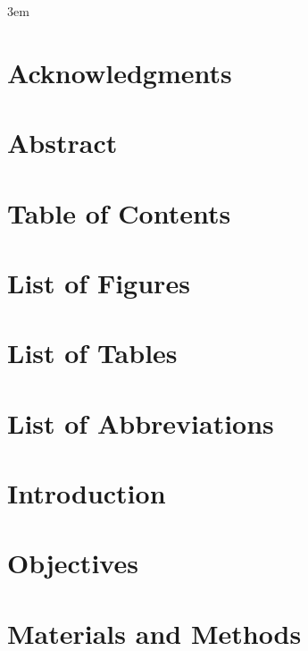 \documentclass[10pt,twoside]{book}
\begin{document}
\emergencystretch 3em

\frontmatter



\chapter{Acknowledgments}

\clearpage

\chapter{Abstract}

\clearpage

\chapter{Table of Contents}
\tableofcontents %
\clearpage

\chapter{List of Figures}
\listoffigures
\clearpage

\chapter{List of Tables}
\listoftables
\clearpage

\chapter{List of Abbreviations}

\clearpage

\mainmatter

\chapter{Introduction}
\clearpage

\clearpage

\chapter{Objectives}
\clearpage

\clearpage

\chapter{Materials and Methods}
\clearpage

\clearpage
\end{document}

